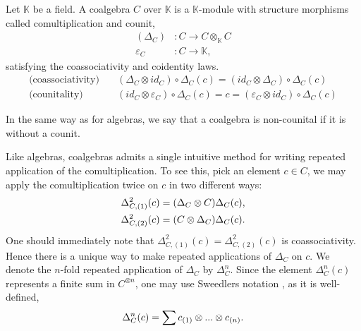 \documentclass[../thesis.tex]{subfiles}
\begin{document}
            \begin{definition}
                Let $\mathbb{K}$ be a field. A coalgebra $C$ over $\mathbb{K}$ is a $\mathbb{K}$-module with structure morphisms called comultiplication and counit,
                \begin{align*}
                    (\Delta_C) & : C \rightarrow C\otimes_{\mathbb{K}}C \\
                    \varepsilon_C & : C \rightarrow \mathbb{K},
                \end{align*}
                satisfying the coassociativity and coidentity laws. 
                \begin{align*}
                    \text{(coassociativity)} \quad & (\Delta_C\otimes id_C)\circ\Delta_C(c) = (id_C\otimes\Delta_C)\circ\Delta_C(c) \\
                    \text{(counitality)} \quad & (id_C\otimes\varepsilon_C)\circ\Delta_C(c) = c = (\varepsilon_C\otimes id_C)\circ\Delta_C(c)
                \end{align*}
            \end{definition}

            In the same way as for algebras, we say that a coalgebra is non-counital if it is without a counit.

            Like algebras, coalgebras admits a single intuitive method for writing repeated application of the comultiplication. To see this, pick an element $c\in C$, we may apply the comultiplication twice on $c$ in two different ways:
            \begin{align*}
                \Delta_{C,(1)}^2(c) & = (\Delta_C \otimes C)\Delta_C(c)\tt{,} \\
                \Delta_{C,(2)}^2(c) & = (C \otimes \Delta_C)\Delta_C(c)\tt{.}
            \end{align*}
            One should immediately note that $\Delta_{C,(1)}^2(c) = \Delta_{C,(2)}^2(c)$ is coassociativity. Hence there is a unique way to make repeated applications of $\Delta_C$ on $c$. We denote the $n$-fold repeated application of $\Delta_C$ by $\Delta_C^n$. Since the element $\Delta_C^n(c)$ represents a finite sum in $C^{\otimes n}$, one may use Sweedlers notation \cite{Loday12}, as it is well-defined,
            \begin{align*}
                \Delta_C^n(c) = \sum c_{(1)}\otimes ... \otimes c_{(n)}\tt{.}
            \end{align*}
            
\end{document}
